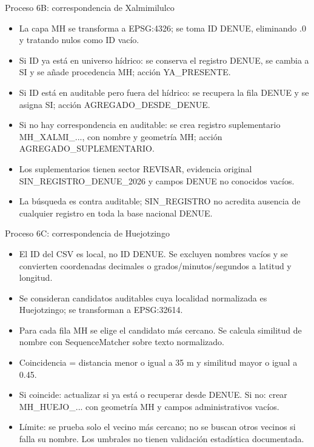 \documentclass[aspectratio=169,10pt]{beamer}
\begin{document}
\begin{frame}{Proceso 6B: correspondencia de Xalmimilulco}
\small
\begin{itemize}
\item La capa MH se transforma a EPSG:4326; se toma ID DENUE, eliminando .0 y tratando nulos como ID vacío.
\item Si ID ya está en universo hídrico: se conserva el registro DENUE, se cambia a SI y se añade procedencia MH; acción YA\_PRESENTE.
\item Si ID está en auditable pero fuera del hídrico: se recupera la fila DENUE y se asigna SI; acción AGREGADO\_DESDE\_DENUE.
\item Si no hay correspondencia en auditable: se crea registro suplementario MH\_XALMI\_..., con nombre y geometría MH; acción AGREGADO\_SUPLEMENTARIO.
\item Los suplementarios tienen sector REVISAR, evidencia original SIN\_REGISTRO\_DENUE\_2026 y campos DENUE no conocidos vacíos.
\item La búsqueda es contra auditable; SIN\_REGISTRO no acredita ausencia de cualquier registro en toda la base nacional DENUE.
\end{itemize}
\end{frame}
\begin{frame}{Proceso 6C: correspondencia de Huejotzingo}
\small
\begin{itemize}
\item El ID del CSV es local, no ID DENUE. Se excluyen nombres vacíos y se convierten coordenadas decimales o grados/minutos/segundos a latitud y longitud.
\item Se consideran candidatos auditables cuya localidad normalizada es Huejotzingo; se transforman a EPSG:32614.
\item Para cada fila MH se elige el candidato más cercano. Se calcula similitud de nombre con SequenceMatcher sobre texto normalizado.
\item Coincidencia = distancia menor o igual a 35 m y similitud mayor o igual a 0.45.
\item Si coincide: actualizar si ya está o recuperar desde DENUE. Si no: crear MH\_HUEJO\_... con geometría MH y campos administrativos vacíos.
\item Límite: se prueba solo el vecino más cercano; no se buscan otros vecinos si falla su nombre. Los umbrales no tienen validación estadística documentada.
\end{itemize}
\end{frame}
\end{document}
